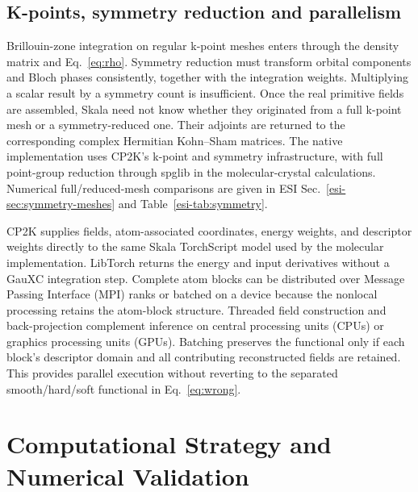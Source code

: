 \documentclass[10pt,a4paper,twocolumn]{article}
\begin{document}
\subsection{K-points, symmetry reduction and parallelism}
\label{sec:kpoints}

Brillouin-zone integration on regular k-point meshes\cite{Monkhorst1976} enters through the density matrix and Eq.~\eqref{eq:rho}. Symmetry reduction must transform orbital components and Bloch phases consistently, together with the integration weights. Multiplying a scalar result by a symmetry count is insufficient. Once the real primitive fields are assembled, Skala need not know whether they originated from a full k-point mesh or a symmetry-reduced one. Their adjoints are returned to the corresponding complex Hermitian Kohn--Sham matrices. The native implementation uses CP2K's k-point and symmetry infrastructure,\cite{CP2KDynamics2026,Alizadeh2026PeriodicGFN2} with full point-group reduction through spglib in the molecular-crystal calculations.\cite{Togo2024Spglib} Numerical full/reduced-mesh comparisons are given in ESI Sec.~\ref{esi-sec:symmetry-meshes} and Table~\ref{esi-tab:symmetry}.

CP2K supplies fields, atom-associated coordinates, energy weights, and descriptor weights directly to the same Skala TorchScript model used by the molecular implementation. LibTorch returns the energy and input derivatives without a GauXC integration step. Complete atom blocks can be distributed over Message Passing Interface (MPI) ranks or batched on a device because the nonlocal processing retains the atom-block structure. Threaded field construction and back-projection complement inference on central processing units (CPUs) or graphics processing units (GPUs). Batching preserves the functional only if each block's descriptor domain and all contributing reconstructed fields are retained. This provides parallel execution without reverting to the separated smooth/hard/soft functional in Eq.~\eqref{eq:wrong}.

\section{Computational Strategy and Numerical Validation}
\label{sec:strategy}
\end{document}

